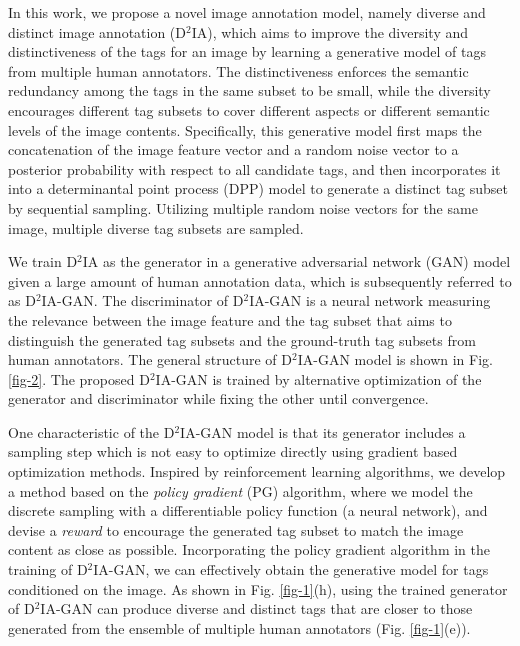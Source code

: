 \documentclass[10pt,twocolumn,letterpaper]{article}
\begin{document}
In this work, we propose a novel image annotation model, namely diverse and distinct image annotation (D$^2$IA), which aims to improve the diversity and distinctiveness of the tags for an image by learning a generative model of tags from multiple human annotators. 
The distinctiveness enforces the semantic redundancy among the tags in the same subset to be small, while the diversity encourages different tag subsets to cover different aspects or different semantic levels of the image contents. 
Specifically, this generative model first maps the concatenation of the image feature vector and a random noise vector to a posterior probability with respect to all candidate tags, and then incorporates it into a determinantal point process (DPP) model \cite{dpp-for-machine-learning-2012} to generate a distinct tag subset by sequential sampling. 
Utilizing multiple random noise vectors for the same image, multiple diverse tag subsets are sampled. 

We train D$^2$IA as the generator in a generative adversarial network (GAN) model \cite{gan-nips-2014} given a large amount of human annotation data, which is subsequently referred to as 
D$^2$IA-GAN. 
The discriminator of D$^2$IA-GAN is a neural network measuring the relevance between the image feature and the tag subset that aims to distinguish the generated tag subsets and the ground-truth tag subsets from human annotators. 
The general structure of D$^2$IA-GAN model is shown in Fig. \ref{fig-2}.
The proposed D$^2$IA-GAN is trained by alternative optimization of the generator and discriminator while fixing the other until convergence.

One characteristic of the D$^2$IA-GAN model is that its generator includes a sampling step which is not easy to optimize directly using gradient based optimization methods. Inspired by reinforcement learning algorithms, we develop a method based on the {\it policy gradient} (PG) algorithm, where we model the discrete sampling with a differentiable policy function (a neural network), and devise a {\it reward} to encourage the generated tag subset to match the image content as close as possible. 
Incorporating the policy gradient algorithm in the training of D$^2$IA-GAN, we can effectively obtain the generative model for tags conditioned on the image. 
%
As shown in Fig. \ref{fig-1}(h), using the trained generator of D$^2$IA-GAN can produce 
diverse and distinct tags that are closer to those generated from the ensemble of multiple human annotators (Fig. \ref{fig-1}(e)).
\end{document}
